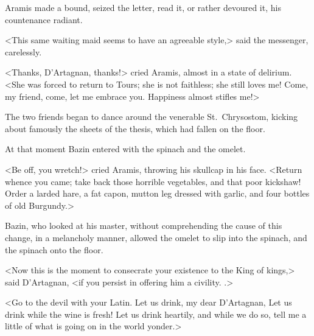 Aramis made a bound, seized the letter, read it, or rather devoured it, his countenance radiant. 

<This same waiting maid seems to have an agreeable style,> said the messenger, carelessly. 

<Thanks, D'Artagnan, thanks!> cried Aramis, almost in a state of delirium. <She was forced to return to Tours; she is not faithless; she still loves me! Come, my friend, come, let me embrace you. Happiness almost stifles me!> 

The two friends began to dance around the venerable St.~Chrysostom, kicking about famously the sheets of the thesis, which had fallen on the floor. 

At that moment Bazin entered with the spinach and the omelet. 

<Be off, you wretch!> cried Aramis, throwing his skullcap in his face. <Return whence you came; take back those horrible vegetables, and that poor kickshaw! Order a larded hare, a fat capon, mutton leg dressed with garlic, and four bottles of old Burgundy.> 

Bazin, who looked at his master, without comprehending the cause of this change, in a melancholy manner, allowed the omelet to slip into the spinach, and the spinach onto the floor. 

<Now this is the moment to consecrate your existence to the King of kings,> said D'Artagnan, <if you persist in offering him a civility. .> 

<Go to the devil with your Latin. Let us drink, my dear D'Artagnan,  Let us drink while the wine is fresh! Let us drink heartily, and while we do so, tell me a little of what is going on in the world yonder.> 